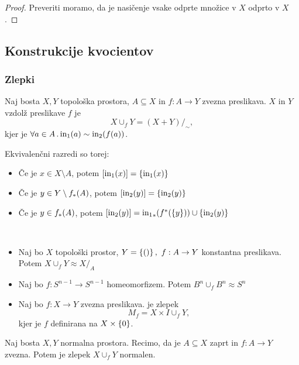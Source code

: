 \begin{proof}
    Preveriti moramo, da je nasičenje vsake odprte množice v \(X\) odprto v \(X\).
\end{proof}

\subsection{Konstrukcije kvocientov}

\newpage
\subsubsection*{Zlepki}
\begin{definicija}
    Naj bosta \(X, Y\) topološka prostora, \(A \subseteq X\) in \(f: A \to Y\) zvezna preslikava.  \(X\) in \(Y\) vzdolž preslikave \(f\) je 
    \[X \cup_f Y = (X + Y)/_\sim,\]
    kjer je \(\forall a \in A \,.\, \text{in}_1(a) \sim \text{in}_2(f(a))\).
\end{definicija}

Ekvivalenčni razredi so torej:
\begin{itemize}
    \item Če je \(x \in X \setminus A\), potem \([\text{in}_1(x)] = \left\{\text{in}_1(x)\right\}\)
    \item Če je \(y \in Y \setminus f_{*}(A)\), potem \([\text{in}_2(y)] = \left\{\text{in}_2(y)\right\}\)
    \item Če je \(y \in f_{*}(A)\), potem \([\text{in}_2(y)] = {\text{in}_1}_{*}(f^{*}(\left\{y\right\})) \cup \left\{\text{in}_2(y)\right\}\)
\end{itemize} 

\begin{primer}
    \ 
    \begin{itemize}
        \item Naj bo \(X\) topološki prostor, \(Y = \left\{()\right\}, \ f: A \to Y\) konstantna preslikava. Potem \(X \cup_f Y \approx X /_A\)
        \item Naj bo \(f: S^{n-1} \to S^{n-1}\) homeomorfizem. Potem \(B^n \cup_f B^n \approx S^n\)
        \item Naj bo \(f: X \to Y\) zvezna preslikava. \df{Preslikavni cilinder} je zlepek 
        \[M_f = X \times I \cup_f Y,\]
        kjer je \(f\) definirana na \(X \times \left\{0\right\}\).
    \end{itemize}
\end{primer}

\begin{izrek}
    Naj bosta \(X, Y\) normalna prostora. Recimo, da je \(A \subseteq X\) zaprt in \(f: A \to Y\) zvezna. Potem je zlepek \(X \cup_f Y\) normalen.
\end{izrek}

